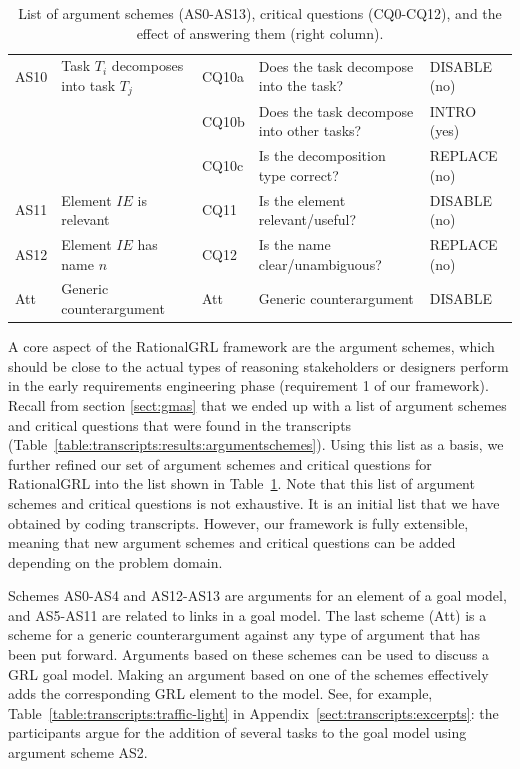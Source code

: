 \begin{table}[t]
\begin{tabularx}{\textwidth}{|l|l|l|X|l|}
\hline
AS10 & Task $T_i$ decomposes into task $T_j$ & CQ10a & Does the task decompose into the task? & \textsf{DISABLE} (no)\\
 &  & CQ10b & Does the task decompose into other tasks?& \textsf{INTRO} (yes)\\
 &  & CQ10c & Is the decomposition type correct? & \textsf{REPLACE} (no)\\
\hline
AS11 & Element $IE$ is relevant & CQ11 & Is the element relevant/useful? & \textsf{DISABLE} (no)\\
\hline
AS12 & Element $IE$ has name $n$ & CQ12 & Is the name clear/unambiguous? & \textsf{REPLACE} (no)\\
\hline
\hline
Att & Generic counterargument & Att & Generic counterargument & \textsf{DISABLE}\\
\hline
\end{tabularx}
\caption{List of argument schemes (AS0-AS13), critical questions (CQ0-CQ12), and the effect of answering them (right column).}
\label{table:argument-schemes}
\end{table}

A core aspect of the RationalGRL framework are the argument schemes, which should be close to the actual types of reasoning stakeholders or designers perform in the early requirements engineering phase (requirement 1 of our framework). Recall from section \ref{sect:gmas} that we ended up with a list of argument schemes and critical questions that were found in the transcripts (Table~\ref{table:transcripts:results:argumentschemes}). Using this list as a basis, we further refined our set of argument schemes and critical questions for RationalGRL into the list shown in Table~\ref{table:argument-schemes}. Note that this list of argument schemes and critical questions is not exhaustive. It is an initial list that we have obtained by coding transcripts. However, our framework is fully extensible, meaning that new argument schemes and critical questions can be added depending on the problem domain.

Schemes AS0-AS4 and AS12-AS13 are arguments for an element of a goal model, and AS5-AS11 are related to links in a goal model. The last scheme (Att) is a scheme for a generic counterargument against any type of argument that has been put forward. Arguments based on these schemes can be used to discuss a GRL goal model. Making an argument based on one of the schemes effectively adds the corresponding GRL element to the model. See, for example, Table~\ref{table:transcripts:traffic-light} in Appendix~\ref{sect:transcripts:excerpts}: the participants argue for the addition of several tasks to the goal model using argument scheme AS2. 

